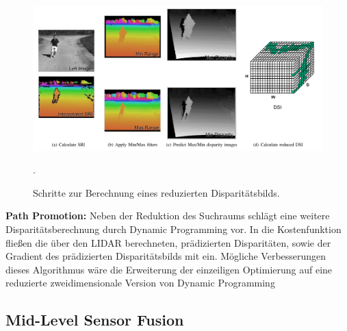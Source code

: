 \documentclass[10pt]{article}
\begin{document}
\begin{figure}[ht]\centering%
	\includegraphics[width=15cm]{images/png/badino_dsi_computation.png}
	\caption[Reduziertes Disparitätsbild]{ Schritte zur Berechnung eines reduzierten Disparitätsbilds. \cite{Badino2011a} }.
	\label{img:badino_computation}
\end{figure}

\textbf{Path Promotion:} Neben der Reduktion des Suchraums schlägt \cite{Badino2011a} eine weitere Disparitätsberechnung durch Dynamic Programming vor. In die Kostenfunktion fließen die über den LIDAR berechneten, prädizierten Disparitäten, sowie der Gradient des prädizierten Disparitätsbilds mit ein.
Mögliche Verbesserungen dieses Algorithmus wäre die Erweiterung der einzeiligen Optimierung auf eine reduzierte zweidimensionale Version von Dynamic Programming



\subsection*{Mid-Level Sensor Fusion}





\end{document}
